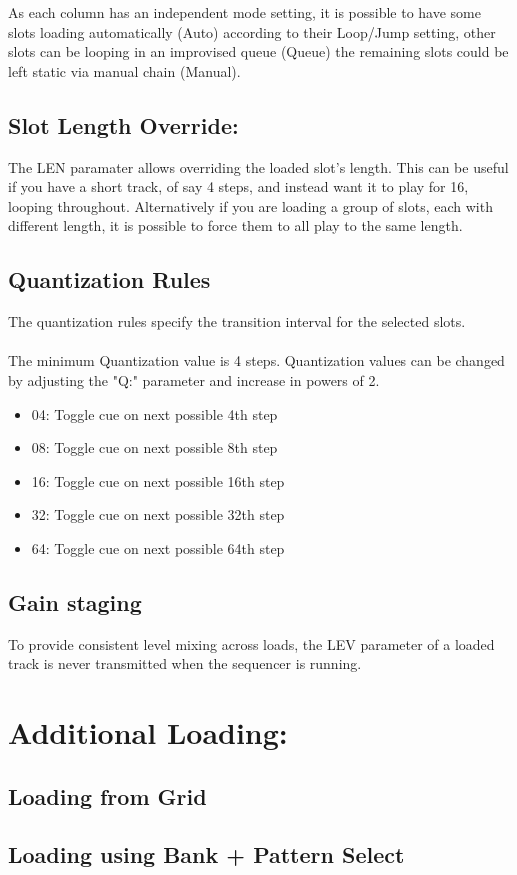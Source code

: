 As each column has an independent mode setting, it is possible to have some slots loading automatically (Auto) according to their Loop/Jump setting, other slots can be looping in an improvised queue (Queue) the remaining slots could be left static via manual chain (Manual).

\section{Slot Length Override:}
The LEN paramater allows overriding the loaded slot's length. This can be useful if you have a short track, of say 4 steps, and instead want it to play for 16, looping throughout. Alternatively if you are loading a group of slots, each with different length, it is possible to force them to all play to the same length.

\section{Quantization Rules}
The quantization rules specify the transition interval for the selected slots.\\
\\
The minimum Quantization value is 4 steps. Quantization values can be changed by adjusting the "Q:" parameter and increase in powers of 2.\\
\begin{itemize}
\item 04: Toggle cue on next possible 4th step
\item 08: Toggle cue on next possible 8th step 
\item 16: Toggle cue on next possible 16th step 
\item 32: Toggle cue on next possible 32th step 
\item 64: Toggle cue on next possible 64th step
\end{itemize}

\section{Gain staging}
To provide consistent level mixing across loads, the LEV parameter of a loaded track is never transmitted when the sequencer is running. 

\newpage
\chapter{Additional Loading:}
\section{Loading from Grid}
\section{Loading using Bank + Pattern Select}
